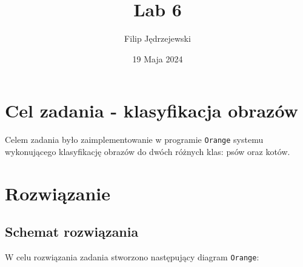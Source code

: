 \documentclass{article}
\title{Lab 6}
\author{Filip Jędrzejewski}
\date{19 Maja 2024}
\begin{document}
\maketitle

\section{Cel zadania - klasyfikacja obrazów}

Celem zadania było zaimplementowanie w programie \texttt{Orange} systemu wykonującego klasyfikację obrazów do dwóch różnych klas: psów oraz kotów.

\section{Rozwiązanie}

\subsection{Schemat rozwiązania}

W celu rozwiązania zadania stworzono następujący diagram \texttt{Orange}:


\end{document}
